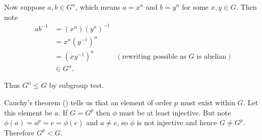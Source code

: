 \begin{questions}
\begin{partquestions}{\roman*}
        Now suppose $a, b \in G^n$, which means $a = x^n$ and $b = y^n$ for some $x, y \in G$. Then note
        \begin{align*}
            ab^{-1} &= (x^n)(y^n)^{-1}\\
            &= x^n(y^{-1})^n\\
            &= (xy^{-1})^n & (\text{rewriting possible as }G \text{ is abelian})\\
            &\in G^n.
        \end{align*}

        Thus $G^n \leq G$ by subgroup test.

        \item Cauchy's theorem () tells us that an element of order $p$ must exist within $G$. Let this element be $a$. If $G = G^p$ then $\phi$ must be at least injective. But note $\phi(a) = a^p = e = \phi(e)$ and $a \neq e$, so $\phi$ is not injective and hence $G \neq G^p$. Therefore $G^p < G$.
    \end{partquestions}
\end{questions}

